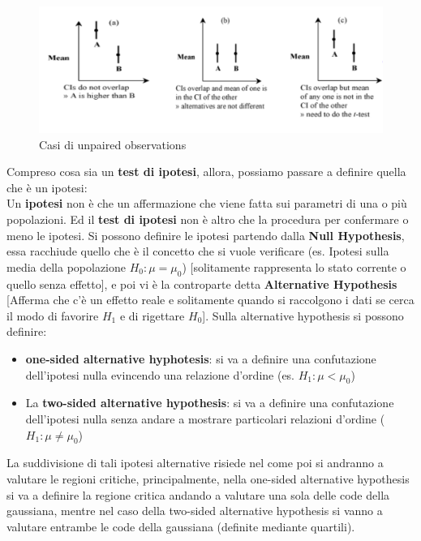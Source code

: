 \begin{figure}[h]
\centering
\includegraphics[width=.7\textwidth]{img/chapter-4/unpaired-observations.png}
\caption{Casi di unpaired observations}\label{img:unpaired-observations}
\end{figure}

Compreso cosa sia un \textbf{test di ipotesi}, allora, possiamo passare a definire quella che è un ipotesi:
\\
Un \textbf{ipotesi} non è che un affermazione che viene fatta sui parametri di una o più popolazioni. Ed il \textbf{test di ipotesi} non è altro che la procedura per confermare o meno le ipotesi. Si possono definire le ipotesi partendo dalla \textbf{Null Hypothesis}, essa racchiude quello che è il concetto che si vuole verificare (es. Ipotesi sulla media della popolazione \(H_0: \mu = \mu_0\)) [solitamente rappresenta lo stato corrente o quello senza effetto], e poi vi è la controparte detta \textbf{Alternative Hypothesis} [Afferma che c'è un effetto reale e solitamente quando si raccolgono i dati se cerca il modo di favorire \(H_1\) e di rigettare \(H_0\)]. Sulla alternative hypothesis si possono definire:
\begin{itemize}
    \item \textbf{one-sided alternative hyphotesis}: si va a definire una confutazione dell'ipotesi nulla evincendo una relazione d'ordine (es. \(H_1: \mu < \mu_0 \))
    \item La \textbf{two-sided alternative hypothesis}: si va a definire una confutazione dell'ipotesi nulla senza andare a mostrare particolari relazioni d'ordine (\(H_1:\mu \not = \mu_0\))
\end{itemize}

La suddivisione di tali ipotesi alternative risiede nel come poi si andranno a valutare le regioni critiche, principalmente, nella one-sided alternative hypothesis si va a definire la regione critica andando a valutare una sola delle code della gaussiana, mentre nel caso della two-sided alternative hypothesis si vanno a valutare entrambe le code della gaussiana (definite mediante quartili).


